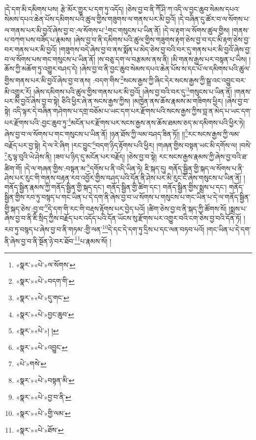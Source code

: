 །དེ་དག་མི་དམིགས་པས། རྩེ་མོར་གྱུར་པ་དག་ཏུ་འདོད། །ཅེས་བྱ་བ་ནི་ཀཽ་ཤི་ཀ་འདི་ལ་བྱང་ཆུབ་སེམས་དཔའ་སེམས་དཔའ་ཆེན་པོས་དམིགས་པའི་ཚུལ་གྱིས་གཟུགས་ལ་གནས་པར་མི་བྱའོ། །དེ་བཞིན་དུ་ཚོར་བ་ལ་སོགས་པ་ལ་གནས་པར་མི་བྱའོ་ཞེས་བྱ་བ་:ལ་སོགས་པ་\footnote{«སྣར་»«པེ་»ལ་སོགས་}གང་གསུངས་པ་ཡིན་ནོ། །དེ་ལ་རྟག་ལ་སོགས་ཚུལ་གྱིས། །གནས་པ་བཀག་པས་བཟོད་པ་རྣམས། །ཞེས་བྱ་བ་ནི་དམིགས་པའི་ཚུལ་གྱིས་གཟུགས་རྟག་ཅེས་བྱ་བ་དང་མི་རྟག་ཅེས་བྱ་བར་གནས་པར་མི་བྱའོ། །གཟུགས་བདེ་ཞེས་བྱ་བ་ནས་སྨོན་པ་མེད་ཅེས་བྱ་བའི་བར་དུ་གནས་པར་མི་བྱའོ་ཞེས་བྱ་བ་ལ་སོགས་པས་གང་གསུངས་པ་ཡིན་ནོ། །ས་བཅུ་དག་ལ་བརྩམས་ནས་ནི། །མི་གནས་རྒྱས་པར་བསྟན་པ་ཡིས། །ཆོས་ཀྱི་མཆོག་ཏུ་འགྱུར་བཤད་དེ། །ཞེས་བྱ་བ་ནི་བྱང་ཆུབ་སེམས་དཔའ་ཆེན་པོས་ས་དང་པོ་ལ་དམིགས་པའི་ཚུལ་གྱིས་གནས་པར་མི་བྱའོ་ཞེས་བྱ་བ་ནས། :བདག་གིས་\footnote{«སྣར་»«པེ་»བདག་གི་}སངས་རྒྱས་ཀྱི་ཞིང་དེར་སངས་རྒྱས་ཀྱི་སྒྲ་འང་འབྱུང་བར་མི་འགྱུར་རོ། །ཞེས་དམིགས་པའི་ཚུལ་གྱིས་གནས་པར་མི་བྱའོ། །ཞེས་བྱ་བའི་བར་དུ་\footnote{«སྣར་»«པེ་»དུ་གང་}གསུངས་པ་ཡིན་ནོ། །གནས་པར་མི་བྱའོ་ཞེས་བྱ་བ་སྟེ། ཅིའི་ཕྱིར་ཞེ་ན་སངས་རྒྱས་ཀྱིས། །མཁྱེན་ནས་ཆོས་རྣམས་མ་གཟིགས་ཕྱིར། །ཞེས་བྱ་བ་སྟེ། འདི་ལྟར་དེ་བཞིན་གཤེགས་པ་དགྲ་བཅོམ་པ་ཡང་དག་པར་རྫོགས་པའི་སངས་རྒྱས་ཀྱིས་བླ་ན་མེད་པ་ཡང་དག་པར་རྫོགས་པའི་:བྱང་ཆུབ་ཏུ་\footnote{«སྣར་»«པེ་»བྱང་ཆུབ་}མངོན་པར་རྫོགས་པར་སངས་རྒྱས་ནས་ཆོས་ཐམས་ཅད་མ་དམིགས་པའི་ཕྱིར་ཏེ། ཞེས་བྱ་བ་ལ་སོགས་པ་གང་གསུངས་པ་ཡིན་ནོ། །ཉན་ཐོས་ཀྱི་ལམ་བཤད་ཟིན་ཏོ།། །།\footnote{«སྣར་»«པེ་»། །}རང་སངས་རྒྱས་ཀྱི་ལམ་བརྗོད་པར་བྱ་སྟེ། དེ་ལ་རེ་ཞིག །རང་བྱུང་\footnote{«སྣར་»«པེ་»འབྱུང་}བདག་ཉིད་རྟོགས་པའི་ཕྱིར། །གཞན་གྱིས་བསྟན་ཡང་མི་དགོས་ལ། །བསེ་\footnote{«པེ་»གསེ་}རུ་ལྟ་བུའི་ཡེ་ཤེས་ནི། །ཟབ་པ་ཉིད་དུ་མངོན་པར་བརྗོད། །ཅེས་བྱ་བ་སྟེ། རང་སངས་རྒྱས་རྣམས་ཀྱི་ཞེས་བྱ་བའི་ཐ་ཚིག་གོ། །དེ་ལ་གཞན་གྱིས་:བསྟན་མ་\footnote{«སྣར་»«པེ་»བསྟན་མི་}དགོས་པ་ནི་འདི་ཡིན་ཏེ། ཇི་སྐད་དུ། གནོད་སྦྱིན་གྱི་སྐད་ལ་སོགས་པ་ནི་ཤེས་པར་རུང་གི་གནས་བརྟན་རབ་འབྱོར་གྱིས་བཤད་པའི་དོན་ནི་ཤེས་པར་མི་རུང་ངོ་ཞེས་གསུངས་པ་ཡིན་ནོ། །གནོད་སྦྱིན་རྣམས་ཀྱི་གནོད་སྦྱིན་གྱི་སྐད་དང་། གནོད་སྦྱིན་གྱི་ཚིག་དང་། གནོད་སྦྱིན་གྱིས་སྨྲས་པ་དང་། གནོད་སྦྱིན་གྱིས་རབ་ཏུ་བསྙད་པ་གང་ཡིན་པ་དེ་དག་ནི་ཞེས་བྱ་བ་ཡ་སོགས་པ་གསུངས་པ་གང་ཡིན་པ་དེ་ལ་གནོད་སྦྱིན་གྱི་སྐད་ཅེས་:བྱ་བ་\footnote{«སྣར་»«པེ་»བྱ་བ་ནི་}དེ་དག་གི་རང་གི་བརྡས་རྟོགས་པར་བྱེད་པའོ། །ཚིག་ཅེས་བྱ་བ་ནི་སྐད་ཀྱི་ཚོགས་སོ། །སྨྲས་པ་ཞེས་བྱ་བ་ནི་ཇི་སྲིད་ཀྱིས་བརྗོད་པར་འདོད་པའི་དོན་ཡོངས་སུ་རྫོགས་པར་འགྱུར་བའི་ངག་ཅེས་བྱ་བའི་དོན་ཏོ། །རབ་ཏུ་བསྙད་པ་ཞེས་བྱ་བ་ནི་གཏམ་:གྱི་ལན་\footnote{«སྣར་»«པེ་»གྱི་ལམ་}དེ་དང་དེ་དག་ཏུ་དྲིས་པ་དང་ལན་བཏབ་པའོ། །གང་ཡིན་པ་དེ་དག་ནི་ཞེས་བྱ་བ་ནི་སྔོན་ཉེ་བར་ཐོབ་\footnote{«སྣར་»«པེ་»ཐོས་}པ་རྣམས་སོ། །
